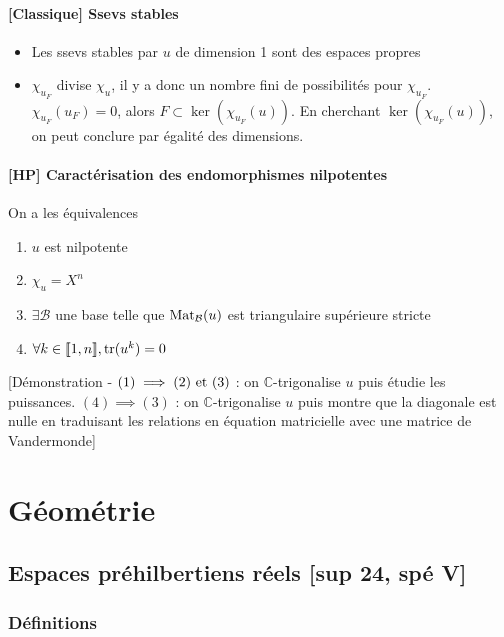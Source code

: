 \documentclass[openany]{book}
\begin{document}
\subsubsection{[Classique] Ssevs stables}
\begin{itemize}
    \item Les ssevs stables par $u$ de dimension 1 sont des espaces propres 
    \item $\chi_{u_F}$ divise $\chi_u$, il y a donc un nombre fini de possibilités pour $\chi_{u_F}$. $\chi_{u_F}(u_F) = 0$, alors $ F \subset \ker( \chi_{u_F}(u) )$. En cherchant $\ker( \chi_{u_F}(u) )$, on peut conclure par égalité des dimensions. 
\end{itemize}

\subsubsection{[HP] Caractérisation des endomorphismes nilpotentes}

On a les équivalences
\begin{enumerate}
    \item $u$ est nilpotente
    \item $\chi_u = X^n$
    \item $\exists \mathcal{B}$ une base telle que $\text{Mat}_{\mathcal{B}}(u)$ est triangulaire supérieure stricte
    \item $\forall k \in \llbracket {1}, {n} \rrbracket, \text{tr} (u^k) = 0$
\end{enumerate}

[Démonstration - $(1) \implies (2) \text{ et } (3)$ : on $\mathbb{C}$-trigonalise $u$ puis étudie les puissances. $(4) \implies (3)$ : on $\mathbb{C}$-trigonalise $u$ puis montre que la diagonale est nulle en traduisant les relations en équation matricielle avec une matrice de Vandermonde]

\clearpage

\chapter{Géométrie}

\section{Espaces préhilbertiens réels [sup 24, spé V]}
\subsection{Définitions}
\end{document}
